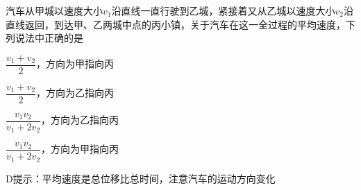 汽车从甲城以速度大小\(v_1\)沿直线一直行驶到乙城，紧接着又从乙城以速度大小\(v_2\)沿直线返回，到达甲、乙两城中点的丙小镇，关于汽车在这一全过程的平均速度，下列说法中正确的是\paren[D]
\begin{choices}
	\item \(\dfrac{v_1 + v_2}{2}\)，方向为甲指向丙
	\item \(\dfrac{v_1 + v_2}{2}\)，方向为乙指向丙
	\item \(\dfrac{v_1v_2}{v_1 + 2v_2}\)，方向为乙指向丙
	\item \(\dfrac{v_1v_2}{v_1 + 2v_2}\)，方向为甲指向丙
\end{choices}
\begin{answer}
	D\qquad 提示：平均速度是总位移比总时间，注意汽车的运动方向变化
\end{answer}